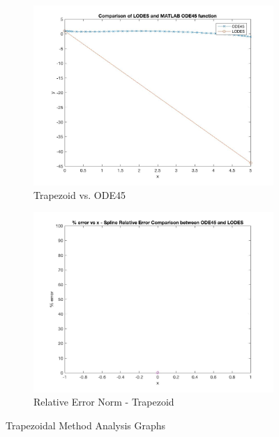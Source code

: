 \documentclass[12pt, titlepage]{article}
\begin{document}
\begin{figure}[H]
\centering
\begin{subfigure}{.55\textwidth}
  \centering
  \includegraphics[width=\linewidth]{images/Test3/2LODESvsMATLABPlot.jpg}
  \caption{Trapezoid vs. ODE45}
  \label{fig:trap3a}
\end{subfigure}%
\begin{subfigure}{.55\textwidth}
  \centering
  \includegraphics[width=\linewidth]{images/Test3/2RelativeErrorPlot.jpg}
  \caption{Relative Error Norm - Trapezoid}
  \label{fig:trap3b}
\end{subfigure}
\caption{Trapezoidal Method Analysis Graphs}
\label{fig:trap3}
\end{figure}
\end{document}
